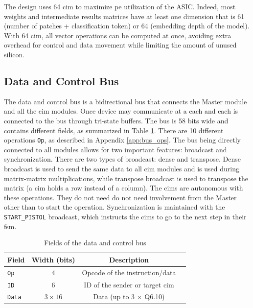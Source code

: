 The design uses 64 \ac{cim} to maximize \ac{pe} utilization of the ASIC. Indeed, most weights and intermediate results matrices have at least one dimension that is 61
(number of patches + classification token) or 64 (embedding depth of the model). With 64 \ac{cim}, all vector operations can be computed at once, avoiding extra overhead
for control and data movement while limiting the amount of unused silicon.

\subsection{Data and Control Bus}
The data and control bus is a bidirectional bus that connects the Master module and all the \ac{cim} modules. Once device may communicate at a each and each is connected to the bus
through tri-state buffers. The bus is 58 bits wide and contains different fields, as summarized in Table \ref{tab:bus_fields}. There are 10 different operations \texttt{Op}, as
described in Appendix \ref{app:bus_ops}. The bus being directly connected to all modules allows for two important features: broadcast and synchronization. There are two types of
broadcast: dense and transpose. Dense broadcast is used to send the same data to all \ac{cim} modules and is used during matrix-matrix multiplications, while transpose broadcast is
used to transpose the matrix (a \ac{cim} holds a row instead of a column). The \ac{cim}s are autonomous with these operations. They do not need do not need involvement from the Master
other than to start the operation. Synchronization is maintained with the \texttt{START\_PISTOL} broadcast, which instructs the \ac{cim}s to go to the next step in their \ac{fsm}.

\begin{table}[ht]
    \centering
    \renewcommand{\arraystretch}{1.2} %
    \setlength{\arrayrulewidth}{1.5pt} %
    \caption{Fields of the data and control bus}
    \begin{tabular}{@{} p{1cm}ccc @{}}
        \toprule
        Field           & Width (bits)  & Description \\\midrule
        \texttt{Op}     & 4             & Opcode of the instruction/data \\
        \texttt{ID}     & 6             & ID of the sender or target \ac{cim} \\
        \texttt{Data}   & $3\times16$   & Data (up to 3 $\times$ Q6.10) \\
        \bottomrule
    \end{tabular}
    \label{tab:bus_fields}
\end{table}

